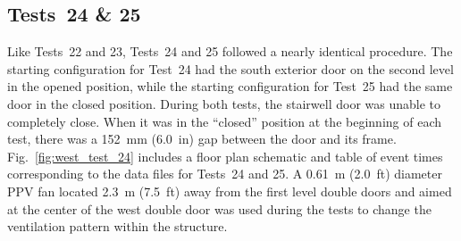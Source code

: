 \documentclass[12pt,oneside]{book}
\begin{document}
\subsection{Tests~24 \& 25}
Like Tests~22 and 23, Tests~24 and 25 followed a nearly identical procedure. The starting configuration for Test~24 had the south exterior door on the second level in the opened position, while the starting configuration for Test~25 had the same door in the closed position. During both tests, the stairwell door was unable to completely close. When it was in the ``closed'' position at the beginning of each test, there was a 152~mm (6.0~in) gap between the door and its frame. Fig.~\ref{fig:west_test_24} includes a floor plan schematic and table of event times corresponding to the data files for Tests~24 and 25. A 0.61~m (2.0~ft) diameter PPV fan located 2.3~m (7.5~ft) away from the first level double doors and aimed at the center of the west double door was used during the tests to change the ventilation pattern within the structure.
\end{document}
